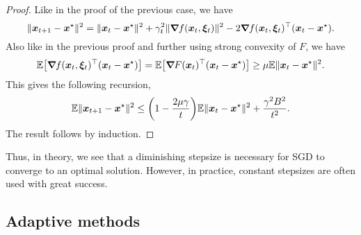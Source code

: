 \begin{proof}
    Like in the proof of the previous case, we have \[
        \| \bm{x}_{t+1} - \bm{x}^\star \|^2 = \| \bm{x}_t - \bm{x}^\star \|^2 + \gamma_t^2 \| \bm{\nabla}_{\! } f(\bm{x}_t, \bm{\xi}_t) \|^2 - 2 \bm{\nabla}_{\! } f(\bm{x}_t, \bm{\xi}_t)^\top (\bm{x}_t - \bm{x}^\star).
    \]
    Also like in the previous proof and further using strong convexity of $F$, we have \[
        \E \lft[ \transpose{\grad{f(\vec{x}_t, \vec{\xi}_t)}{}} (\vec{x}_t - \vec{x}^\star) \rgt] = \E \lft[ \transpose{\grad{F(\vec{x}_t)}{}} (\vec{x}_t - \vec{x}^\star) \rgt] \geq \mu \E \| \vec{x}_t - \vec{x}^\star \|^2.
    \]
    This gives the following recursion, \[
        \E \| \vec{x}_{t+1} - \vec{x}^\star \|^2 \leq \lft( 1 - \frac{2 \mu \gamma}{t} \rgt) \E \| \vec{x}_t - \vec{x}^\star \|^2 + \frac{\gamma^2 B^2}{t^2}.
    \]
    The result follows by induction. %
\end{proof}

Thus, in theory, we see that a diminishing stepsize is necessary for SGD to converge to an optimal
solution. However, in practice, constant stepsizes are often used with great success.

\subsection{Adaptive methods}

